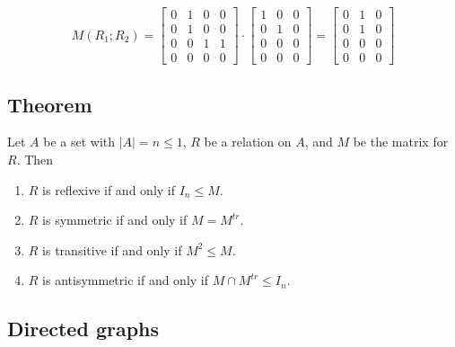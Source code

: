 \documentclass[11pt]{article}
\begin{document}
    \begin{equation*}
        M(R_1;R_2) = \begin{bmatrix}
                        0 & 1 & 0 & 0 \\
                        0 & 1 & 0 & 0 \\
                        0 & 0 & 1 & 1 \\
                        0 & 0 & 0 & 0
                    \end{bmatrix} \cdot \begin{bmatrix}
                                            1 & 0 & 0 \\
                                            0 & 1 & 0 \\
                                            0 & 0 & 0 \\
                                            0 & 0 & 0
                                        \end{bmatrix} = \begin{bmatrix}
                                                            0 & 1 & 0 \\
                                                            0 & 1 & 0 \\
                                                            0 & 0 & 0 \\
                                                            0 & 0 & 0
                                                        \end{bmatrix}
    \end{equation*}

    \subsection{Theorem}

    Let $A$ be a set with \(|A| = n \leq 1\), $R$ be a relation on $A$, and $M$ be the matrix for $R$. Then 
    \begin{enumerate}
        \item $R$ is reflexive if and only if \(I_n \leq M\).
        \item $R$ is symmetric if and only if \(M = M^{tr}\).
        \item $R$ is transitive if and only if \(M^2 \leq M\).
        \item $R$ is antisymmetric if and only if \(M \cap M^{tr} \leq I_n\).
    \end{enumerate}

    \subsection{Directed graphs}
\end{document}
